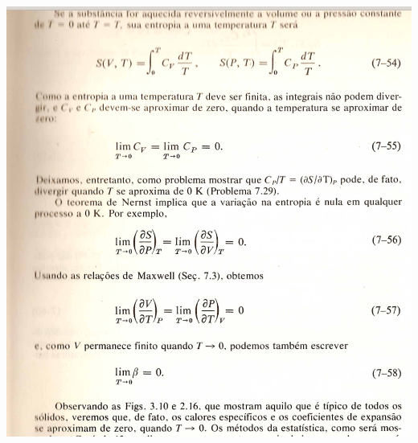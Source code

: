 \documentclass[t,%
brazilian,%
11pt,%
aspectratio=169,%
table%
]{beamer}
\begin{document}
 \begin{frame}
     \centering
     \includegraphics[height=\textheight-10pt]{images/Captura de tela de 2023-05-24 13-04-37.png}
 \end{frame}
\end{document}
